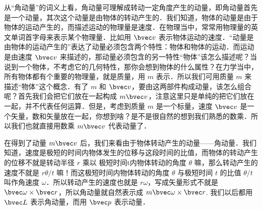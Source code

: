
\begin{issues}
\issueTODO
\end{issues}

从“角动量”的词义上看，角动量可理解成转动一定角度产生的动量，即角动量首先是一个动量，其次这个动量是由物体的转动产生的．我们知道，物体的动量是由于物体的运动产生的，而描述运动的物理量是速度．在物理当中，常常用物理量的英文单词首字母来表示某个物理量．比如用 $\bvec v$ 表示物体运动的速度．“动量是由物体的运动产生的”表达了动量必须包含两个特性：物体和物体的运动．而运动是由速度 $\bvec v$ 来描述的，那动量必须包含的另一特性“物体”该怎么描述呢？当说到一个物体，不考虑它的几何特性，那你会想到物体的什么属性？在力学当中，所有物体都有个重要的物理量，就是质量，用 $m$ 表示．所以我们可用质量 $m$ 来描述“物体”这个概念．有了 $m$ 和 $\bvec v$，要由这两部件构成动量，该怎么组合呢？首先我们会把它们放在一起构成 $m\bvec v$，注意这里只是单纯的把它们放在一起，并不代表任何运算．但是，考虑到质量 $m$ 是一个标量，速度 $\bvec v$ 是一个矢量，数和矢量放在一起，你想到啥？是不是很自然的想到我们熟悉的数乘．所以我们也就直接用数乘 $m\bvec v$ 代表动量了．

在得到了动量 $m\bvec v$ 后，我们来看由于物体转动产生的动量——角动量．我们知道，速度是极短的时间内物体发生的位移与这段时间的比值，而物体的转动产生的位移不就是转动半径 $r$ 乘以 极短时间t内物体转动的角度 $\theta$ 嘛，那么转动产生的速度不就是 $r\theta/t$ 嘛！而这极短时间内物体转动的角度 $\theta$ 与极短时间 $t$ 的比值 $\theta/t$ 叫作角速度 $\omega$．所以转动产生的速度也就是 $r\omega$，写成矢量形式不就是 $\bvec \omega\times \bvec r$，所以角动量就自然表示成 $m\bvec \omega\times \bvec r$. 我们以后都用 $\bvec L$ 表示角动量，而用 $\bvec p$ 表示动量．
